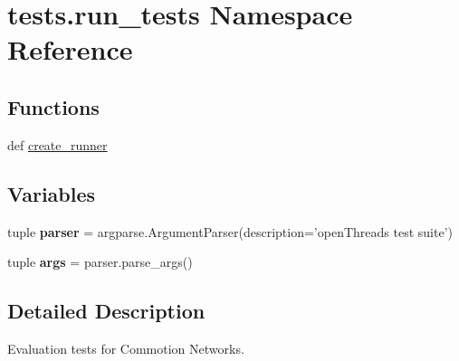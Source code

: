 \hypertarget{namespacetests_1_1run__tests}{\section{tests.\-run\-\_\-tests Namespace Reference}
\label{namespacetests_1_1run__tests}
}
\subsection*{Functions}
\begin{DoxyCompactItemize}
\item 
def \hyperlink{namespacetests_1_1run__tests_a89c91ae48d760f119a2d16441f8a2d01}{create\-\_\-runner}
\end{DoxyCompactItemize}
\subsection*{Variables}
\begin{DoxyCompactItemize}
\item 
\hypertarget{namespacetests_1_1run__tests_a9589a243fcfd62aff67b19214974bc74}{tuple {\bfseries parser} = argparse.\-Argument\-Parser(description='open\-Threads test suite')}\label{namespacetests_1_1run__tests_a9589a243fcfd62aff67b19214974bc74}

\item 
\hypertarget{namespacetests_1_1run__tests_a600052a32daf91fd45feebcb45741d42}{tuple {\bfseries args} = parser.\-parse\-\_\-args()}\label{namespacetests_1_1run__tests_a600052a32daf91fd45feebcb45741d42}

\end{DoxyCompactItemize}


\subsection{Detailed Description}
\begin{DoxyVerb}Evaluation tests for Commotion Networks.\end{DoxyVerb}
 

